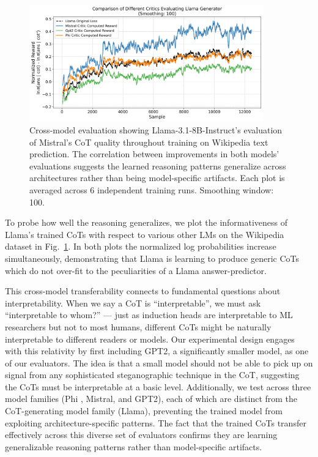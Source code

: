 \documentclass{article}
\theoremstyle{plain}
\theoremstyle{definition}
\theoremstyle{remark}
\begin{document}
\begin{figure}[ht]
  \centering
  \includegraphics[width=0.9\textwidth]{Figures/wiki_multi_critic_comparison.png}
  \caption{Cross-model evaluation showing Llama-3.1-8B-Instruct's evaluation of Mistral's CoT quality throughout training on Wikipedia text prediction. The correlation between improvements in both models' evaluations suggests the learned reasoning patterns generalize across architectures rather than being model-specific artifacts. Each plot is averaged across 6 independent training runs. Smoothing window: 100.}
  \label{fig:cross_eval}
\end{figure}

To probe how well the reasoning generalizes, we plot the informativeness of Llama's trained CoTs with respect to various other LMs on the Wikipedia dataset in Fig.~\ref{fig:cross_eval}. In both plots the normalized log probabilities increase simultaneously, demonstrating that Llama is learning to produce generic CoTs which do not over-fit to the peculiarities of a Llama answer-predictor. 

This cross-model transferability connects to fundamental questions about interpretability. When we say a CoT is ``interpretable'', we must ask ``interpretable to whom?'' --- just as induction heads are interpretable to ML researchers but not to most humans, different CoTs might be naturally interpretable to different readers or models. Our experimental design engages with this relativity by first including GPT2, a significantly smaller model, as one of our evaluators. The idea is that a small model should not be able to pick up on signal from any sophisticated steganographic technique in the CoT, suggesting the CoTs must be interpretable at a basic level. Additionally, we test across three model families (Phi \citep{abdin2024phi3technicalreporthighly}, Mistral, and GPT2), each of which are distinct from the CoT-generating model family (Llama), preventing the trained model from exploiting architecture-specific patterns. The fact that the trained CoTs transfer effectively across this diverse set of evaluators confirms they are learning generalizable reasoning patterns rather than model-specific artifacts.
\end{document}
